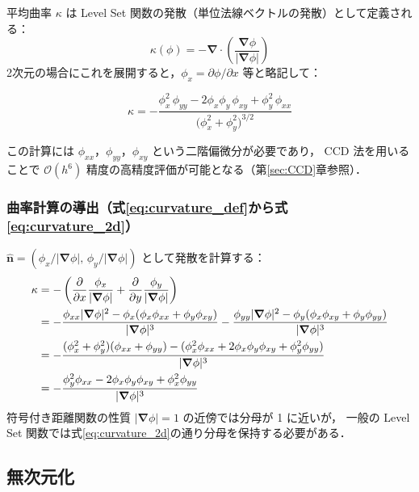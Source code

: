 \documentclass[12pt, a4paper, titlepage]{article}
\newcommand{\jp}[1]{{\normalfont\jpfont #1}}
\newcommand{\pd}[2]{\dfrac{\partial #1}{\partial #2}}
\newcommand{\bnabla}{\bm{\nabla}}
\newcommand{\Ord}[1]{\mathcal{O}(#1)}
\begin{document}
\jp{平均曲率 $\kappa$ は Level Set 関数の発散（単位法線ベクトルの発散）として定義される：}
\begin{equation}
  \kappa(\phi) = -\bnabla\cdot\!\left(\frac{\bnabla\phi}{|\bnabla\phi|}\right)
  \label{eq:curvature_def}
\end{equation}
\jp{2次元の場合にこれを展開すると，$\phi_x = \partial\phi/\partial x$ 等と略記して：}
\begin{tcolorbox}[mybox, title={\jp{2次元界面曲率（展開形）}}]
\begin{equation}
  \kappa = -\frac{
    \phi_x^2\,\phi_{yy}
    - 2\phi_x\phi_y\,\phi_{xy}
    + \phi_y^2\,\phi_{xx}
  }{\bigl(\phi_x^2 + \phi_y^2\bigr)^{3/2}}
  \label{eq:curvature_2d}
\end{equation}
\end{tcolorbox}
\jp{この計算には $\phi_{xx}$，$\phi_{yy}$，$\phi_{xy}$ という二階偏微分が必要であり，
CCD 法を用いることで $\Ord{h^6}$ 精度の高精度評価が可能となる（第\ref{sec:CCD}章参照）．}

\subsubsection{\jp{曲率計算の導出（式\eqref{eq:curvature_def}から式\eqref{eq:curvature_2d}）}}

\jp{$\hat{\bm{n}} = (\phi_x/|\bnabla\phi|,\, \phi_y/|\bnabla\phi|)$ として発散を計算する：}
\begin{align}
  \kappa
  &= -\left(\pd{}{x}\frac{\phi_x}{|\bnabla\phi|}
           + \pd{}{y}\frac{\phi_y}{|\bnabla\phi|}\right) \notag\\
  &= -\frac{\phi_{xx}|\bnabla\phi|^2 - \phi_x(\phi_x\phi_{xx}+\phi_y\phi_{xy})}{|\bnabla\phi|^3}
     -\frac{\phi_{yy}|\bnabla\phi|^2 - \phi_y(\phi_x\phi_{xy}+\phi_y\phi_{yy})}{|\bnabla\phi|^3}
     \notag\\
  &= -\frac{(\phi_x^2+\phi_y^2)(\phi_{xx}+\phi_{yy})
            - (\phi_x^2\phi_{xx}+2\phi_x\phi_y\phi_{xy}+\phi_y^2\phi_{yy})}{|\bnabla\phi|^3}
     \notag\\
  &= -\frac{\phi_y^2\phi_{xx} - 2\phi_x\phi_y\phi_{xy} + \phi_x^2\phi_{yy}}{|\bnabla\phi|^3}
\end{align}
\jp{符号付き距離関数の性質 $|\bnabla\phi|=1$ の近傍では分母が 1 に近いが，
一般の Level Set 関数では式\eqref{eq:curvature_2d}の通り分母を保持する必要がある．}

\subsection{\jp{無次元化}}
\end{document}
